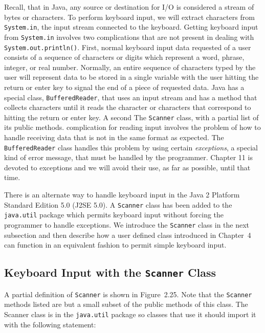 Recall, that in Java, any source or destination for I/O is considered a 
stream of bytes or characters.  To perform keyboard input, we will extract
characters from {\tt System.in}, the input stream connected to the keyboard. 
Getting keyboard input from  {\tt System.in} involves two complications
that are not present in dealing with {\tt System.out.println()}.
First, normal keyboard input data requested of a user consists of a sequence
of characters or digits which represent a word, phrase, integer, or real 
number.  Normally, an entire sequence of characters typed by the user 
will represent data to be stored in a single variable with the user hitting 
the return or enter key to signal the end of a piece of requested data. Java has a
special class, {\tt BufferedReader}, that uses an input stream 
and has a method that collects characters until it reads the character or
characters that correspond to hitting the return or enter key. A second 
{The {\tt Scanner} class, with a
partial list of its public methods.
\label{fig-scanneruml}}
complication for reading input involves the problem of how to handle 
receiving data that is not in the same format as expected.  The 
{\tt BufferedReader} class handles this problem by using certain {\it exceptions},
a special kind of error message, that must be handled by the programmer.
Chapter 11 is devoted to exceptions and we will avoid their use, as far as
possible, until that time.

There is an alternate way to handle keyboard input in the Java 2
Platform Standard Edition 5.0 (J2SE 5.0). A {\tt Scanner} class has
been added to the {\tt java.util} package which permits keyboard input
without forcing the programmer to handle exceptions.  We introduce the
{\tt Scanner} class in the next subsection and then describe how a
user defined class introduced in Chapter~4 can function in an
equivalent fashion to permit simple keyboard input.

\subsection{Keyboard Input with the {\tt Scanner} Class} 

A partial definition of {\tt Scanner} is shown in Figure~2.25. Note
that the {\tt Scanner} methods listed are but a small subset of the 
public methods of this class.  The Scanner class is in the {\tt java.util}
package so classes that use it should import it with the following statement:

